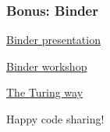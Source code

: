 \documentclass{beamer}
\begin{document}
	\begin{frame}
	\frametitle{Bonus: Binder}
	
	\href{https://docs.google.com/presentation/d/1IP_0RclPDHT3ezbdFjxc8D0xwMJIhWNnnNgTWkbKyVI/edit?usp=sharing}{Binder presentation}

	\vspace{0.5cm}

	\href{https://github.com/choldgraf/uw-reproducibility-2019}{Binder workshop}

	\vspace{0.5cm}

	\href{https://the-turing-way.netlify.com/introduction/introduction}{The Turing way}

	\end{frame}

	\begin{frame}
	\centering
		\Huge{Happy code sharing!}
	\end{frame}
\end{document}
